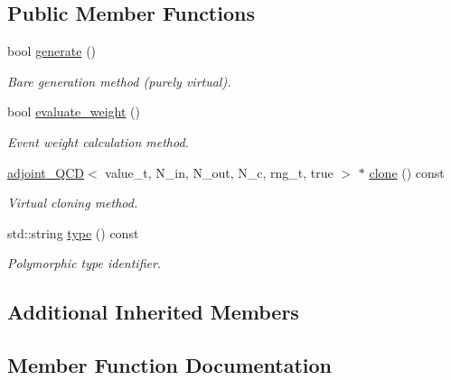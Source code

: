 \subsection*{Public Member Functions}
\begin{DoxyCompactItemize}
\item 
bool \hyperlink{a00005_ab5732608de6b76d3545c9e4df43d1e5e}{generate} ()
\begin{DoxyCompactList}\small\item\em \textquotesingle{}Bare generation\textquotesingle{} method (purely virtual). \end{DoxyCompactList}\item 
\hypertarget{a00005_aa47fd0e18ee6ae32195b512ccfd15325}{}bool \hyperlink{a00005_aa47fd0e18ee6ae32195b512ccfd15325}{evaluate\+\_\+weight} ()\label{a00005_aa47fd0e18ee6ae32195b512ccfd15325}

\begin{DoxyCompactList}\small\item\em Event weight calculation method. \end{DoxyCompactList}\item 
\hypertarget{a00005_af29fb05f782cda8f4b0f4ee9f49d9589}{}\hyperlink{a00003}{adjoint\+\_\+\+Q\+C\+D}$<$ value\+\_\+t, N\+\_\+in, N\+\_\+out, N\+\_\+c, rng\+\_\+t, true $>$ $\ast$ \hyperlink{a00005_af29fb05f782cda8f4b0f4ee9f49d9589}{clone} () const \label{a00005_af29fb05f782cda8f4b0f4ee9f49d9589}

\begin{DoxyCompactList}\small\item\em Virtual cloning method. \end{DoxyCompactList}\item 
\hypertarget{a00005_a6bf5e94c39857c3cda0e5f7631d95fc5}{}std\+::string \hyperlink{a00005_a6bf5e94c39857c3cda0e5f7631d95fc5}{type} () const \label{a00005_a6bf5e94c39857c3cda0e5f7631d95fc5}

\begin{DoxyCompactList}\small\item\em Polymorphic type identifier. \end{DoxyCompactList}\end{DoxyCompactItemize}
\subsection*{Additional Inherited Members}


\subsection{Member Function Documentation}
\hypertarget{a00005_ab5732608de6b76d3545c9e4df43d1e5e}{}
